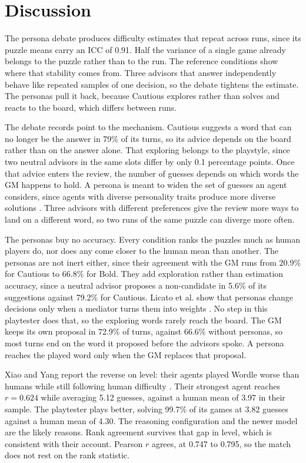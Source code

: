 \documentclass[conference]{IEEEtran}
\begin{document}
\section{Discussion}
\label{sec:discussion}

The persona debate produces difficulty estimates that repeat across runs, since its puzzle means carry an ICC of 0.91. Half the variance of a single game already belongs to the puzzle rather than to the run. The reference conditions show where that stability comes from. Three advisors that answer independently behave like repeated samples of one decision, so the debate tightens the estimate. The personas pull it back, because Cautious explores rather than solves and reacts to the board, which differs between runs.

The debate records point to the mechanism. Cautious suggests a word that can no longer be the answer in 79\% of its turns, so its advice depends on the board rather than on the answer alone. That exploring belongs to the playstyle, since two neutral advisors in the same slots differ by only 0.1 percentage points. Once that advice enters the review, the number of guesses depends on which words the GM happens to hold. A persona is meant to widen the set of guesses an agent considers, since agents with diverse personality traits produce more diverse solutions \cite{chen2025}. Three advisors with different preferences give the review more ways to land on a different word, so two runs of the same puzzle can diverge more often.

The personas buy no accuracy. Every condition ranks the puzzles much as human players do, nor does any come closer to the human mean than another. The personas are not inert either, since their agreement with the GM runs from 20.9\% for Cautious to 66.8\% for Bold. They add exploration rather than estimation accuracy, since a neutral advisor proposes a non-candidate in 5.6\% of its suggestions against 79.2\% for Cautious. Licato et al. show that personas change decisions only when a mediator turns them into weights \cite{licato2025}. No step in this playtester does that, so the exploring words rarely reach the board. The GM keeps its own proposal in 72.9\% of turns, against 66.6\% without personas, so most turns end on the word it proposed before the advisors spoke. A persona reaches the played word only when the GM replaces that proposal.

Xiao and Yang report the reverse on level: their agents played Wordle worse than humans while still following human difficulty \cite{xiao2025}. Their strongest agent reaches $r = 0.624$ while averaging 5.12 guesses, against a human mean of 3.97 in their sample. The playtester plays better, solving 99.7\% of its games at 3.82 guesses against a human mean of 4.30. The reasoning configuration and the newer model are the likely reasons. Rank agreement survives that gap in level, which is consistent with their account. Pearson $r$ agrees, at 0.747 to 0.795, so the match does not rest on the rank statistic.
\end{document}

